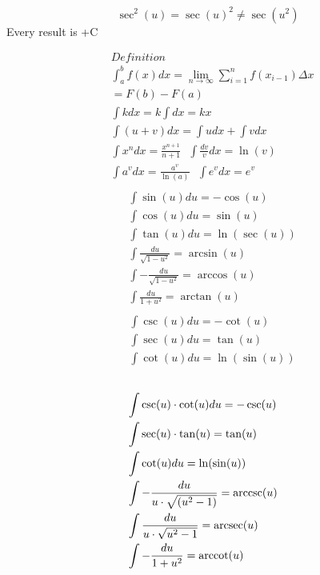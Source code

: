               \[\sec^2(u)=\sec(u)^2 \ne \sec(u^2)\]
              Every result is +C
              \begin{vwcol}[widths={0.2,0.6,0.6,0.2}, sep=.5cm, justify=flush,rule=2pt,indent=0em]
                \begin{align*}
                  &Definition\\
                  &\int_a^b f(x) dx = \lim_{{n \to \infty}} \sum_{{i=1}}^{n} f(x_{i-1}) \Delta x\\
                  &=F(b)-F(a)\\
                  &\int kdx = k\int  dx = kx\\
                  &\int (u + v)dx = \int u dx + \int vdx \\
                  &\int x^ndx=\frac{x^{n+1}}{n+1} \textbf{ } \int \frac{dv}{v}dx= \ln(v)\\
                  &\int a^vdx=\frac{a^v}{\ln(a)} \textbf{ } \int e^vdx=e^v
                \end{align*}
                \begin{align*}
                  \\&\int \sin(u)du = -\cos(u)
                  \\&\int \cos(u)du = \sin(u)
                  \\&\int \tan(u)du = \ln(\sec(u))
                  \\&\int \frac{du}{\sqrt{1-u^2}} = \arcsin(u)
                  \\&\int -\frac{du}{\sqrt{1-u^2}} = \arccos(u)
                  \\&\int \frac{du}{1+u^2} = \arctan(u)
                \end{align*}
                \begin{align*}
                  \\&\int \csc(u)du = -\cot(u)
                  \\&\int \sec(u)du = \tan(u)
                  \\&\int \cot(u)du = \ln(\sin(u))
                \end{align*}
                \begin{align*}
                  \\&\int \csc(u)\cdot \cot(u) du = -\csc(u)
                  \\&\int \sec(u)\cdot \tan(u) = \tan(u)
                  \\&\int \cot(u)du = \ln(\sin(u))
                  \\&\int -\frac{du}{u\cdot \sqrt{(u^2-1)}} = \operatorname{arccsc}(u)
                  \\&\int \frac{du}{u\cdot \sqrt{u^2-1}} = \operatorname{arcsec}(u)
                  \\&\int -\frac{du}{1+u^2} = \operatorname{arccot}(u)
                \end{align*}
              \end{vwcol}
